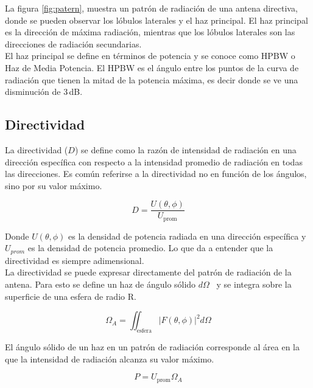 La figura \ref{fig:patern}, muestra un patrón de radiación de una antena directiva, donde se pueden observar los lóbulos laterales y el haz principal. El haz principal es la dirección de máxima radiación, mientras que los lóbulos laterales son las direcciones de radiación secundarias.\\

El haz principal se define en términos de potencia y se conoce como HPBW o Haz de Media Potencia. El HPBW es el ángulo entre los puntos de la curva de radiación que tienen la mitad de la potencia máxima, es decir donde se ve una disminución de 3 dB.\\

\subsection{Directividad}

La directividad ($D$) se define como la razón de intensidad de radiación en una dirección específica con respecto a la intensidad promedio de radiación en todas las direcciones. Es común referirse a la directividad no en función de los ángulos, sino por su valor máximo.

\begin{equation}\label{eq:directivity}
    D = \frac{U(\theta, \phi)}{U_{\text{prom}}}
\end{equation}

Donde $U(\theta, \phi)$ es la densidad de potencia radiada en una dirección específica y $U_{prom}$ es la densidad de potencia promedio. Lo que da a entender que la directividad es siempre adimensional.\\

La directividad se puede expresar directamente del patrón de radiación de la antena. Para esto se define un haz de ángulo sólido $d\Omega$  y se integra sobre la superficie de una esfera de radio R.

\begin{equation}\label{eq:solidangle}
    \Omega_{A} = \iint_{\text{esfera}} |F(\theta, \phi)|^{2} d\Omega
\end{equation}

El ángulo sólido de un haz en un patrón de radiación corresponde al área en la que la intensidad de radiación alcanza su valor máximo.

\begin{equation}\label{eq:powerdensity}
    P = U_{\text{prom}} \Omega_{A}
\end{equation}

